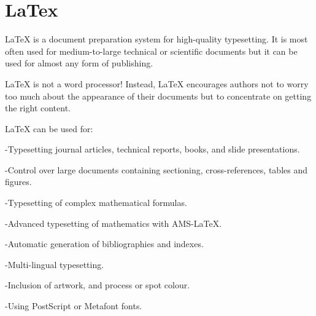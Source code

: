 \chapter{LaTex}
LaTeX is a document preparation system for high-quality typesetting. It is most often used for medium-to-large technical or scientific documents but it can be used for almost any form of publishing.
\vspace{1cm}

LaTeX is not a word processor! Instead, LaTeX encourages authors not to worry too much about the appearance of their documents but to concentrate on getting the right content.
\vspace{1cm}

LaTeX can be used for:
\vspace{1cm}

-Typesetting journal articles, technical reports, books, and slide presentations.
\vspace{0.5cm}

-Control over large documents containing sectioning, cross-references, tables and figures.
\vspace{0.5cm}

-Typesetting of complex mathematical formulas.
\vspace{0.5cm}

-Advanced typesetting of mathematics with AMS-LaTeX.
\vspace{0.5cm}

-Automatic generation of bibliographies and indexes.
\vspace{0.5cm}

-Multi-lingual typesetting.
\vspace{0.5cm}

-Inclusion of artwork, and process or spot colour.
\vspace{0.5cm}

-Using PostScript or Metafont fonts. 
